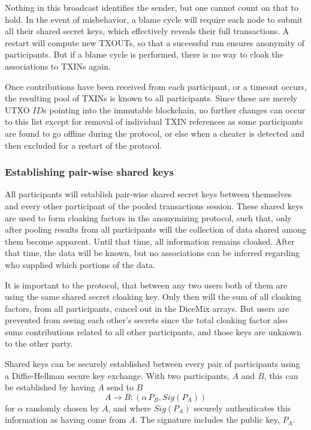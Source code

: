 \documentclass[a4paper, 10pt, conference]{ieeeconf}
\begin{document}
Nothing in this broadcast identifies the sender, but one cannot count on that to hold. In the event of misbehavior, a blame cycle will require each node to submit all their shared secret keys, which effectively reveals their full transactions. A restart will compute new TXOUTs, so that a successful run ensures anonymity of participants. But if a blame cycle is performed, there is no way to cloak the associations to TXINs again.

Once contributions have been received from each participant, or a timeout occurs, the resulting pool of TXINs is known to all participants. Since these are merely UTXO $ID$s pointing into the immutable blockchain, no further changes can occur to this list except for removal of individual TXIN references as some participants are found to go offline during the protocol, or else when a cheater is detected and then excluded for a restart of the protocol.

\subsubsection{Establishing pair-wise shared keys} All participants will establish pair-wise shared secret keys between themselves and every other participant of the pooled transactions session. These shared keys are used to form cloaking factors in the anonymizing protocol, such that, only after pooling results from all participants will the collection of data shared among them become apparent. Until that time, all information remains cloaked. After that time, the data will be known, but no associations can be inferred regarding who supplied which portions of the data. 

It is important to the protocol, that between any two users both of them are using the same shared secret cloaking key. Only then will the sum of all cloaking factors, from all participants, cancel out in the DiceMix arrays. But users are prevented from seeing each other's secrets since the total cloaking factor also sums contributions related to all other participants, and those keys are unknown to the other party.

Shared keys can be securely established between every pair of participants using a Diffie-Hellman secure key exchange\cite{c21}. With two participants, $A$ and $B$, this can be established by having $A$ send to $B$
$$A \rightarrow B: (\alpha \, P_B, Sig(P_A))$$
for $\alpha$ randomly chosen by $A$, and where $Sig(P_A)$ securely authenticates this information as having come from $A$. The signature includes the public key, $P_A$. 
\end{document}
